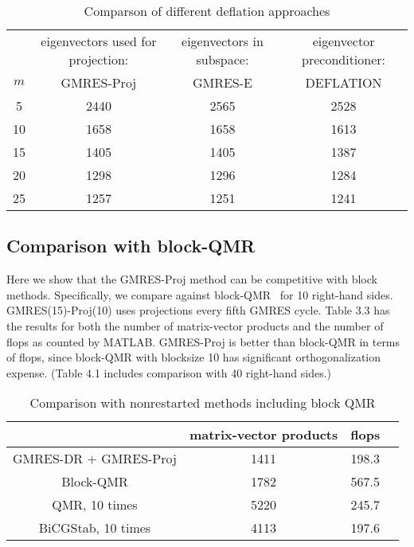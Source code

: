 \documentclass[final]{siamltex}
\begin{document}
\begin{table}
\caption{Comparson of different deflation approaches} 

\begin{center} \footnotesize
\begin{tabular}{|c|c|c|c|}  \hline\hline
       & eigenvectors used for projection: &  eigenvectors in subspace: & eigenvector preconditioner: \\ 
$m$    & GMRES-Proj  &  GMRES-E            & DEFLATION  \\  
\hline \hline
5      & 2440    & 2565 & 2528 \\ \hline
10     & 1658    & 1658 & 1613 \\ \hline
15     & 1405    & 1405 & 1387 \\ \hline
20     & 1298    & 1296 & 1284 \\ \hline 
25     & 1257    & 1251 & 1241 \\ \hline

\hline\hline 

\end{tabular} 
\end{center} 
\end{table} 

\subsection{Comparison with block-QMR}

Here we show that the GMRES-Proj method can be competitive with block methods.  Specifically, we compare against block-QMR~\cite{FrMa} for 10 right-hand sides.  GMRES(15)-Proj(10) uses projections every fifth GMRES cycle.  Table 3.3 has the results for both the number of matrix-vector products and the number of flops as counted by MATLAB.  GMRES-Proj is better than block-QMR in terms of flops, since block-QMR with blocksize 10 has significant orthogonalization expense.  (Table 4.1 includes comparison with 40 right-hand sides.)

\begin{table}
\caption{Comparison with nonrestarted methods including block QMR} 

\begin{center} \footnotesize
\begin{tabular}{|c|c|c|c|}  \hline\hline
       & matrix-vector products  &  flops     \\  
\hline \hline
GMRES-DR + GMRES-Proj  & 1411    & 198.3   \\ \hline
Block-QMR              & 1782    & 567.5   \\ \hline
QMR, 10 times          & 5220    & 245.7   \\ \hline
BiCGStab, 10 times     & 4113    & 197.6   \\ \hline 

\hline\hline 

\end{tabular} 
\end{center} 
\end{table} 
\end{document}
